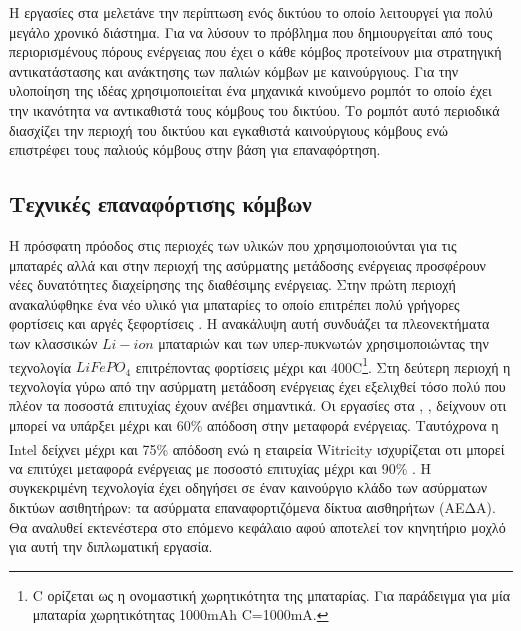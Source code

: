 Η εργασίες στα \cite{sens_deployment1} \cite{sens_deployment2} μελετάνε την περίπτωση ενός δικτύου το οποίο λειτουργεί για πολύ μεγάλο χρονικό διάστημα. Για να
λύσουν το πρόβλημα που δημιουργείται από τους περιορισμένους πόρους ενέργειας που έχει ο κάθε κόμβος προτείνουν μια στρατηγική αντικατάστασης και ανάκτησης των παλιών
κόμβων με καινούργιους. Για την υλοποίηση της ιδέας χρησιμοποιείται ένα μηχανικά κινούμενο ρομπότ το οποίο έχει την ικανότητα να αντικαθιστά τους κόμβους του
δικτύου. Το ρομπότ αυτό περιοδικά διασχίζει την περιοχή του δικτύου και εγκαθιστά καινούργιους κόμβους ενώ επιστρέφει τους παλιούς κόμβους στην βάση για επαναφόρτηση.


\subsection{Τεχνικές επαναφόρτισης κόμβων} \label{sc:recharg_tecnhiques}
Η πρόσφατη πρόοδος στις περιοχές των υλικών που χρησιμοποιούνται για τις μπαταρές αλλά και στην περιοχή της ασύρματης μετάδοσης ενέργειας προσφέρουν νέες δυνατότητες
διαχείρησης της διαθέσιμης ενέργειας. Στην πρώτη περιοχή ανακαλύφθηκε ένα νέο υλικό για μπαταρίες το οποίο επιτρέπει πολύ γρήγορες φορτίσεις και αργές ξεφορτίσεις
\cite{fast_recharging}. Η ανακάλυψη αυτή συνδυάζει τα πλεονεκτήματα των κλασσικών $Li-ion$ μπαταριών και των υπερ-πυκνωτών χρησιμοποιώντας την τεχνολογία
$LiFePO_{4}$ επιτρέποντας φορτίσεις μέχρι και 400C\footnote{C ορίζεται ως η ονομαστική χωρητικότητα της μπαταρίας. Για παράδειγμα για μία
μπαταρία χωρητικότητας 1000mAh C=1000mA.}. Στη δεύτερη περιοχή η τεχνολογία γύρω από την ασύρματη μετάδοση ενέργειας έχει εξελιχθεί τόσο πολύ που πλέον τα ποσοστά
επιτυχίας έχουν ανέβει σημαντικά. Οι εργασίες στα \cite{wireless_recharg1}, \cite{wireless_recharg2}, \cite{wireless_recharg3} δείχνουν οτι μπορεί να υπάρξει μέχρι
και 60\% απόδοση στην μεταφορά ενέργειας. Ταυτόχρονα η Intel\textsuperscript{\textregistered} δείχνει μέχρι και 75\% απόδοση \cite{intel_recharg} ενώ η εταιρεία
Witricity\textsuperscript{\textregistered} ισχυρίζεται οτι μπορεί να επιτύχει μεταφορά ενέργειας με ποσοστό επιτυχίας μέχρι και 90\% \cite{witricity_90}. Η
συγκεκριμένη τεχνολογία έχει οδηγήσει σε έναν καινούργιο κλάδο των ασύρματων δικτύων ασιθητήρων: τα ασύρματα επαναφορτιζόμενα δίκτυα αισθηρήτων (ΑΕΔΑ). Θα αναλυθεί
εκτενέστερα στο επόμενο κεφάλαιο αφού αποτελεί τον κηνητήριο μοχλό για αυτή την διπλωματική εργασία.
























